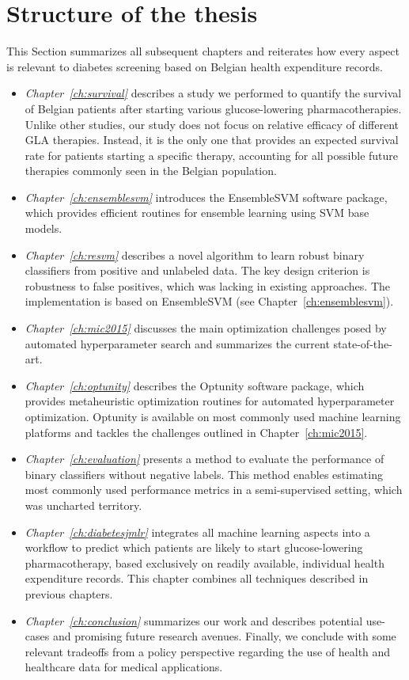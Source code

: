 \section{Structure of the thesis} \label{intro:structure}
This Section summarizes all subsequent chapters  and reiterates how every aspect is relevant to diabetes screening based on Belgian health expenditure records.

\newcommand{\chapteritem}[2]{\item \emph{Chapter~\ref{ch:#1}} #2}
\begin{itemize}

\chapteritem{survival} describes a study we performed to quantify the survival of Belgian patients after starting various glucose-lowering pharmacotherapies. Unlike other studies, our study does not focus on relative efficacy of different GLA therapies. Instead, it is the only one that provides an expected survival rate for patients starting a specific therapy, accounting for all possible future therapies commonly seen in the Belgian population.

\chapteritem{ensemblesvm}{introduces the EnsembleSVM software package, which provides efficient routines for ensemble learning using SVM base models.}

\chapteritem{resvm}{describes a novel algorithm to learn robust binary classifiers from positive and unlabeled data. The key design criterion is robustness to false positives, which was lacking in existing approaches. The implementation is based on EnsembleSVM (see Chapter~\ref{ch:ensemblesvm}).}

\chapteritem{mic2015}{discusses the main optimization challenges posed by automated hyperparameter search and summarizes the current state-of-the-art.}

\chapteritem{optunity}{describes the Optunity software package, which provides metaheuristic optimization routines for automated hyperparameter optimization. Optunity is available on most commonly used machine learning platforms and tackles the challenges outlined in Chapter~\ref{ch:mic2015}.}

\chapteritem{evaluation}{presents a method to evaluate the performance of binary classifiers without negative labels. This method enables estimating most commonly used performance metrics in a semi-supervised setting, which was uncharted territory.}

\chapteritem{diabetesjmlr}{integrates all machine learning aspects into a workflow to predict which patients are likely to start glucose-lowering pharmacotherapy, based exclusively on readily available, individual health expenditure records. This chapter combines all techniques described in previous chapters.}

\chapteritem{conclusion}{summarizes our work and describes potential use-cases and promising future research avenues. Finally, we conclude with some relevant tradeoffs from a policy perspective regarding the use of health and healthcare data for medical applications.}

\end{itemize}
